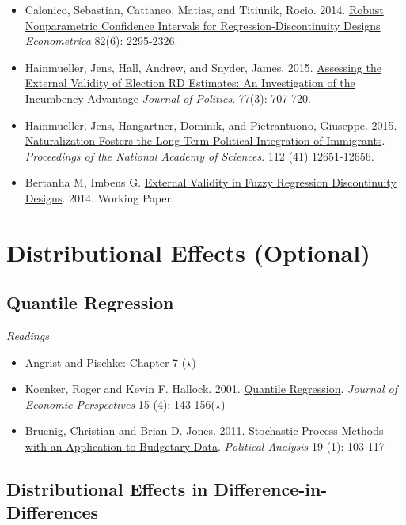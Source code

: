 \documentclass{article}
\begin{document}
\begin{itemize}
\item Calonico, Sebastian, Cattaneo, Matias, and Titiunik, Rocio. 2014. \href{http://onlinelibrary.wiley.com/doi/10.3982/ECTA11757/abstract}{Robust Nonparametric Confidence Intervals for Regression-Discontinuity Designs} \textit{Econometrica} 82(6): 2295-2326.
\item Hainmueller, Jens, Hall, Andrew, and Snyder, James. 2015. \href{http://www.jstor.org/stable/10.1086/681238}{Assessing the External Validity of Election RD Estimates: An Investigation of the Incumbency Advantage} \textit{Journal of Politics}. 77(3): 707-720.
\item Hainmueller, Jens, Hangartner, Dominik, and Pietrantuono, Giuseppe. 2015. \href{http://www.pnas.org/content/112/41/12651.abstract?sid=8efc8281-95c9-4973-9a2c-bae8df47fd4a}{Naturalization Fosters the Long-Term Political Integration of Immigrants}. \textit{Proceedings of the National Academy of Sciences}. 112 (41) 12651-12656.
\item Bertanha M, Imbens G. \href{http://www.nber.org/papers/w20773}{External Validity in Fuzzy Regression Discontinuity Designs}. 2014. Working Paper.

\end{itemize}

\section{Distributional Effects (Optional)}

\subsection{Quantile Regression}

\emph{Readings}
\begin{itemize}
\item Angrist and Pischke: Chapter 7 ($\star$)
\item Koenker, Roger and Kevin F. Hallock. 2001.  \href{http://www.jstor.org/stable/2696522} {Quantile Regression}. \textit{Journal of Economic Perspectives} 15 (4): 143-156($\star$)
\item Bruenig, Christian and Brian D. Jones. 2011. \href{http://pan.oxfordjournals.org/content/19/1/103.full.pdf+html}{Stochastic Process Methods with an Application to Budgetary Data}. \textit{Political Analysis} 19 (1): 103-117
\end{itemize}

\subsection{Distributional Effects in Difference-in-Differences}
\end{document}
